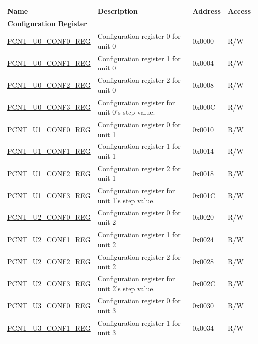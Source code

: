 \begin{longtable}{ | p{6cm} | p{7.2cm} | p{1.3cm} | p{1cm} | }
\hline\rowcolor{lightgray}
\textbf{Name} & \textbf{Description} &  \textbf{Address} & \textbf{Access} \\ \hline
\endhead
\multicolumn{4}{|l|}{\textbf{Configuration Register}} \\ \hline
\hyperref[regdesc:PCNTUNCONF0REG]{PCNT\_U0\_CONF0\_REG} & Configuration register 0 for unit 0 & 0x0000 & R/W \\ \hline
\hyperref[regdesc:PCNTUNCONF1REG]{PCNT\_U0\_CONF1\_REG} & Configuration register 1 for unit 0 & 0x0004 & R/W \\ \hline
\hyperref[regdesc:PCNTUNCONF2REG]{PCNT\_U0\_CONF2\_REG} & Configuration register 2 for unit 0 & 0x0008 & R/W \\ \hline
\hyperref[regdesc:PCNTUNCONF3REG]{PCNT\_U0\_CONF3\_REG} & Configuration register for unit 0's step value. & 0x000C & R/W \\ \hline
\hyperref[regdesc:PCNTUNCONF0REG]{PCNT\_U1\_CONF0\_REG} & Configuration register 0 for unit 1 & 0x0010 & R/W \\ \hline
\hyperref[regdesc:PCNTUNCONF1REG]{PCNT\_U1\_CONF1\_REG} & Configuration register 1 for unit 1 & 0x0014 & R/W \\ \hline
\hyperref[regdesc:PCNTUNCONF2REG]{PCNT\_U1\_CONF2\_REG} & Configuration register 2 for unit 1 & 0x0018 & R/W \\ \hline
\hyperref[regdesc:PCNTUNCONF3REG]{PCNT\_U1\_CONF3\_REG} & Configuration register for unit 1's step value. & 0x001C & R/W \\ \hline
\hyperref[regdesc:PCNTUNCONF0REG]{PCNT\_U2\_CONF0\_REG} & Configuration register 0 for unit 2 & 0x0020 & R/W \\ \hline
\hyperref[regdesc:PCNTUNCONF1REG]{PCNT\_U2\_CONF1\_REG} & Configuration register 1 for unit 2 & 0x0024 & R/W \\ \hline
\hyperref[regdesc:PCNTUNCONF2REG]{PCNT\_U2\_CONF2\_REG} & Configuration register 2 for unit 2 & 0x0028 & R/W \\ \hline
\hyperref[regdesc:PCNTUNCONF3REG]{PCNT\_U2\_CONF3\_REG} & Configuration register for unit 2's step value. & 0x002C & R/W \\ \hline
\hyperref[regdesc:PCNTUNCONF0REG]{PCNT\_U3\_CONF0\_REG} & Configuration register 0 for unit 3 & 0x0030 & R/W \\ \hline
\hyperref[regdesc:PCNTUNCONF1REG]{PCNT\_U3\_CONF1\_REG} & Configuration register 1 for unit 3 & 0x0034 & R/W \\ \hline

\end{longtable}
